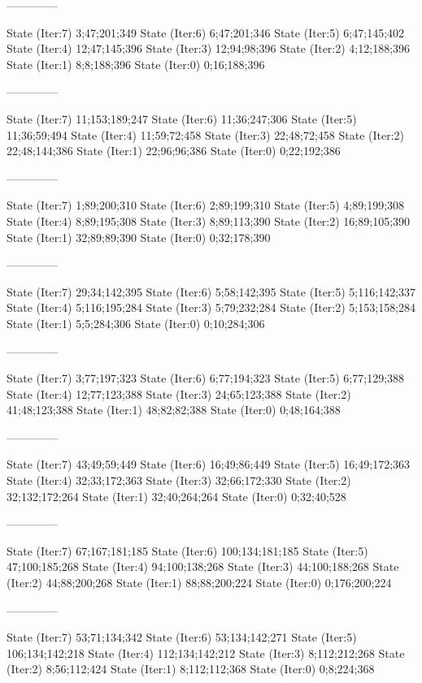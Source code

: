 \documentclass[a4paper,10pt,ngerman]{scrartcl}
\begin{document}
\begin{lstcs}
--------------

State (Iter:7) {3;47;201;349}
State (Iter:6) {6;47;201;346}
State (Iter:5) {6;47;145;402}
State (Iter:4) {12;47;145;396}
State (Iter:3) {12;94;98;396}
State (Iter:2) {4;12;188;396}
State (Iter:1) {8;8;188;396}
State (Iter:0) {0;16;188;396}

--------------

State (Iter:7) {11;153;189;247}
State (Iter:6) {11;36;247;306}
State (Iter:5) {11;36;59;494}
State (Iter:4) {11;59;72;458}
State (Iter:3) {22;48;72;458}
State (Iter:2) {22;48;144;386}
State (Iter:1) {22;96;96;386}
State (Iter:0) {0;22;192;386}

--------------

State (Iter:7) {1;89;200;310}
State (Iter:6) {2;89;199;310}
State (Iter:5) {4;89;199;308}
State (Iter:4) {8;89;195;308}
State (Iter:3) {8;89;113;390}
State (Iter:2) {16;89;105;390}
State (Iter:1) {32;89;89;390}
State (Iter:0) {0;32;178;390}

--------------

State (Iter:7) {29;34;142;395}
State (Iter:6) {5;58;142;395}
State (Iter:5) {5;116;142;337}
State (Iter:4) {5;116;195;284}
State (Iter:3) {5;79;232;284}
State (Iter:2) {5;153;158;284}
State (Iter:1) {5;5;284;306}
State (Iter:0) {0;10;284;306}

--------------

State (Iter:7) {3;77;197;323}
State (Iter:6) {6;77;194;323}
State (Iter:5) {6;77;129;388}
State (Iter:4) {12;77;123;388}
State (Iter:3) {24;65;123;388}
State (Iter:2) {41;48;123;388}
State (Iter:1) {48;82;82;388}
State (Iter:0) {0;48;164;388}

--------------

State (Iter:7) {43;49;59;449}
State (Iter:6) {16;49;86;449}
State (Iter:5) {16;49;172;363}
State (Iter:4) {32;33;172;363}
State (Iter:3) {32;66;172;330}
State (Iter:2) {32;132;172;264}
State (Iter:1) {32;40;264;264}
State (Iter:0) {0;32;40;528}

--------------

State (Iter:7) {67;167;181;185}
State (Iter:6) {100;134;181;185}
State (Iter:5) {47;100;185;268}
State (Iter:4) {94;100;138;268}
State (Iter:3) {44;100;188;268}
State (Iter:2) {44;88;200;268}
State (Iter:1) {88;88;200;224}
State (Iter:0) {0;176;200;224}

--------------

State (Iter:7) {53;71;134;342}
State (Iter:6) {53;134;142;271}
State (Iter:5) {106;134;142;218}
State (Iter:4) {112;134;142;212}
State (Iter:3) {8;112;212;268}
State (Iter:2) {8;56;112;424}
State (Iter:1) {8;112;112;368}
State (Iter:0) {0;8;224;368}


\end{lstcs}
\end{document}
